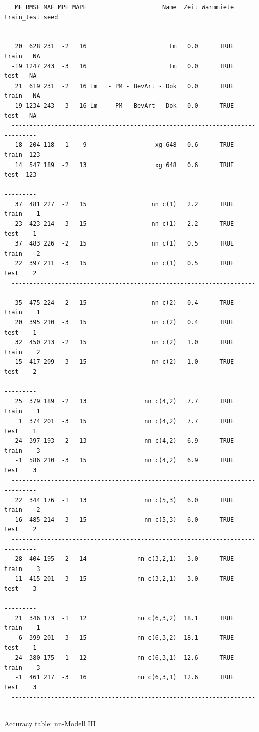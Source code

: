 \begin{table}[H]	
	\begin{verbatim}
   ME RMSE MAE MPE MAPE                     Name  Zeit Warmmiete train_test seed
   -----------------------------------------------------------------------------
   20  628 231  -2   16                       Lm   0.0      TRUE      train   NA
  -19 1247 243  -3   16                       Lm   0.0      TRUE       test   NA
   21  619 231  -2   16 Lm   - PM - BevArt - Dok   0.0      TRUE      train   NA
  -19 1234 243  -3   16 Lm   - PM - BevArt - Dok   0.0      TRUE       test   NA
  -----------------------------------------------------------------------------
   18  204 118  -1    9                   xg 648   0.6      TRUE      train  123
   14  547 189  -2   13                   xg 648   0.6      TRUE       test  123
  -----------------------------------------------------------------------------
   37  481 227  -2   15                  nn c(1)   2.2      TRUE      train    1
   23  423 214  -3   15                  nn c(1)   2.2      TRUE       test    1
   37  483 226  -2   15                  nn c(1)   0.5      TRUE      train    2
   22  397 211  -3   15                  nn c(1)   0.5      TRUE       test    2
  -----------------------------------------------------------------------------
   35  475 224  -2   15                  nn c(2)   0.4      TRUE      train    1
   20  395 210  -3   15                  nn c(2)   0.4      TRUE       test    1
   32  450 213  -2   15                  nn c(2)   1.0      TRUE      train    2
   15  417 209  -3   15                  nn c(2)   1.0      TRUE       test    2 
  -----------------------------------------------------------------------------
   25  379 189  -2   13                nn c(4,2)   7.7      TRUE      train    1
    1  374 201  -3   15                nn c(4,2)   7.7      TRUE       test    1
   24  397 193  -2   13                nn c(4,2)   6.9      TRUE      train    3
   -1  586 210  -3   15                nn c(4,2)   6.9      TRUE       test    3	
  -----------------------------------------------------------------------------
   22  344 176  -1   13                nn c(5,3)   6.0      TRUE      train    2
   16  485 214  -3   15                nn c(5,3)   6.0      TRUE       test    2
  -----------------------------------------------------------------------------
   28  404 195  -2   14              nn c(3,2,1)   3.0      TRUE      train    3
   11  415 201  -3   15              nn c(3,2,1)   3.0      TRUE       test    3
  -----------------------------------------------------------------------------
   21  346 173  -1   12              nn c(6,3,2)  18.1      TRUE      train    1
    6  399 201  -3   15              nn c(6,3,2)  18.1      TRUE       test    1
   24  380 175  -1   12              nn c(6,3,1)  12.6      TRUE      train    3
   -1  461 217  -3   16              nn c(6,3,1)  12.6      TRUE       test    3
  -----------------------------------------------------------------------------
	\end{verbatim}
	\caption{Accuracy table: nn-Modell III}
	\label{tbl: nn-Modell III}
\end{table}
	
